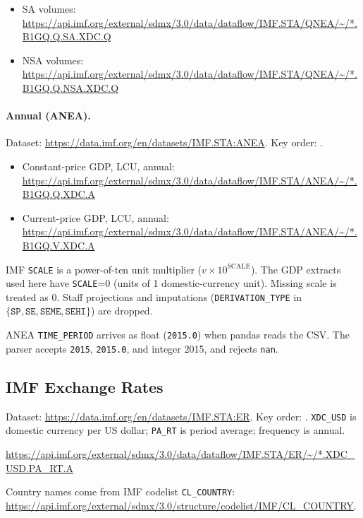 \documentclass[11pt]{article}
\begin{document}
\begin{itemize}
\item SA volumes:
\url{https://api.imf.org/external/sdmx/3.0/data/dataflow/IMF.STA/QNEA/~/*.B1GQ.Q.SA.XDC.Q}
\item NSA volumes:
\url{https://api.imf.org/external/sdmx/3.0/data/dataflow/IMF.STA/QNEA/~/*.B1GQ.Q.NSA.XDC.Q}
\end{itemize}

\paragraph{Annual (ANEA).}
Dataset: \url{https://data.imf.org/en/datasets/IMF.STA:ANEA}.
Key order:
.

\begin{itemize}
\item Constant-price GDP, LCU, annual:
\url{https://api.imf.org/external/sdmx/3.0/data/dataflow/IMF.STA/ANEA/~/*.B1GQ.Q.XDC.A}
\item Current-price GDP, LCU, annual:
\url{https://api.imf.org/external/sdmx/3.0/data/dataflow/IMF.STA/ANEA/~/*.B1GQ.V.XDC.A}
\end{itemize}

IMF \texttt{SCALE} is a power-of-ten unit multiplier
($v\times 10^{\mathrm{SCALE}}$). The GDP extracts used here have
\texttt{SCALE}=0 (units of 1 domestic-currency unit). Missing scale is treated
as 0. Staff projections and imputations
(\texttt{DERIVATION\_TYPE} in $\{\texttt{SP},\texttt{SE},\texttt{SEME},\texttt{SEHI}\}$)
are dropped.

ANEA \texttt{TIME\_PERIOD} arrives as float (\texttt{2015.0}) when pandas reads
the CSV. The parser accepts \texttt{2015}, \texttt{2015.0}, and integer 2015,
and rejects \texttt{nan}.

\subsection{IMF Exchange Rates}

Dataset: \url{https://data.imf.org/en/datasets/IMF.STA:ER}.
Key order:
.
\texttt{XDC\_USD} is domestic currency per US dollar; \texttt{PA\_RT} is period
average; frequency is annual.

\url{https://api.imf.org/external/sdmx/3.0/data/dataflow/IMF.STA/ER/~/*.XDC_USD.PA_RT.A}

Country names come from IMF codelist \texttt{CL\_COUNTRY}:
\url{https://api.imf.org/external/sdmx/3.0/structure/codelist/IMF/CL_COUNTRY}.
\end{document}
